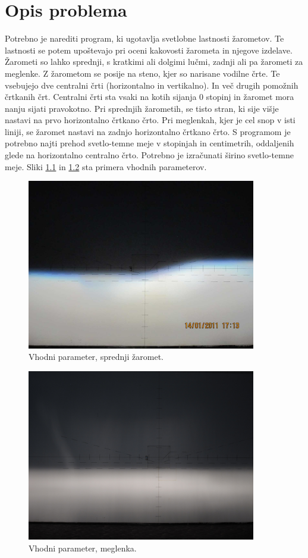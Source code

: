 \documentclass[oneside, a4paper, 12pt]{book}
\begin{document}
\chapter{Opis problema}
Potrebno je narediti program, ki ugotavlja svetlobne lastnosti žarometov. Te lastnosti se potem upoštevajo pri oceni kakovosti žarometa in njegove izdelave. Žarometi so lahko sprednji, s kratkimi ali dolgimi lučmi, zadnji ali pa žarometi za meglenke.
Z žarometom se posije na steno, kjer so narisane vodilne črte. Te vsebujejo dve centralni črti (horizontalno in vertikalno). In več drugih pomožnih črtkanih črt. Centralni črti sta vsaki na kotih sijanja 0 stopinj in žaromet mora nanju sijati pravokotno. Pri sprednjih žarometih, se tisto stran, ki sije višje nastavi na prvo horizontalno črtkano črto. Pri meglenkah, kjer je cel snop v isti liniji, se žaromet nastavi na zadnjo horizontalno črtkano črto. 
S programom je potrebno najti prehod svetlo-temne meje v stopinjah in centimetrih, oddaljenih glede na horizontalno centralno črto. Potrebno je izračunati širino svetlo-temne meje.
Sliki \ref{pic:vhp1} in \ref{pic:vhp2} sta primera vhodnih parameterov.

\begin{figure}
\begin{center}
\includegraphics[width=10cm]{slike/original.jpg}
\end{center}
\caption{Vhodni parameter, sprednji žaromet.}
\label{pic:vhp1}
\end{figure}

\begin{figure}
\begin{center}
\includegraphics[width=10cm]{slike/levi3.JPG}
\end{center}
\caption{Vhodni parameter, meglenka.}
\label{pic:vhp2}
\end{figure}
\end{document}
